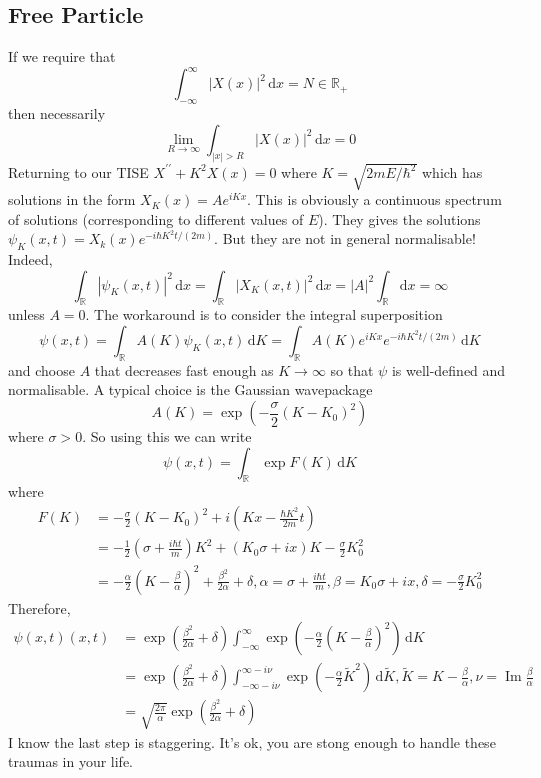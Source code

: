 \subsection{Free Particle}
If we require that
$$\int_{-\infty}^\infty |X(x)|^2\,\mathrm dx=N\in\mathbb R_+$$
then necessarily
$$\lim_{R\to\infty}\int_{|x|>R}|X(x)|^2\,\mathrm dx=0$$
Returning to our TISE $X^{\prime\prime}+K^2X(x)=0$ where $K=\sqrt{2mE/\hbar^2}$ which has solutions in the form $X_K(x)=Ae^{iKx}$.
This is obviously a continuous spectrum of solutions (corresponding to different values of $E$).
They gives the solutions $\psi_K(x,t)=X_k(x)e^{-i\hbar K^2t/(2m)}$.
But they are not in general normalisable!
Indeed,
$$\int_{\mathbb R}|\psi_K(x,t)|^2\,\mathrm dx=\int_{\mathbb R}|X_K(x,t)|^2\,\mathrm dx=|A|^2\int_{\mathbb R}\mathrm dx=\infty$$
unless $A=0$.
The workaround is to consider the integral superposition
$$\psi(x,t)=\int_{\mathbb R}A(K)\psi_K(x,t)\,\mathrm dK=\int_{\mathbb R}A(K)e^{iKx}e^{-i\hbar K^2t/(2m)}\,\mathrm dK$$
and choose $A$ that decreases fast enough as $K\to\infty$ so that $\psi$ is well-defined and normalisable.
A typical choice is the Gaussian wavepackage
$$A(K)=\exp\left( -\frac{\sigma}{2}(K-K_0)^2 \right)$$
where $\sigma>0$.
So using this we can write
$$\psi(x,t)=\int_{\mathbb R}\exp F(K)\,\mathrm dK$$
where
\begin{align*}
    F(K)&=-\frac{\sigma}{2}(K-K_0)^2+i\left(Kx-\frac{\hbar K^2}{2m}t\right)\\
    &=-\frac{1}{2}\left( \sigma+\frac{i\hbar t}{m} \right)K^2+(K_0\sigma+ix)K-\frac{\sigma}{2}K_0^2\\
    &=-\frac{\alpha}{2}\left( K-\frac{\beta}{\alpha} \right)^2+\frac{\beta^2}{2\alpha}+\delta,\alpha=\sigma+\frac{i\hbar t}{m},\beta=K_0\sigma+ix,\delta=-\frac{\sigma}{2}K_0^2
\end{align*}
Therefore,
\begin{align*}
    \psi(x,t)(x,t)&=\exp\left( \frac{\beta^2}{2\alpha}+\delta \right)\int_{-\infty}^\infty\exp\left( -\frac{\alpha}{2}\left( K-\frac{\beta}{\alpha} \right)^2 \right)\,\mathrm dK\\
    &=\exp\left( \frac{\beta^2}{2\alpha}+\delta \right)\int_{-\infty-i\nu}^{\infty-i\nu}\exp\left( -\frac{\alpha}{2}\tilde{K}^2 \right)\,\mathrm d\tilde{K},\tilde{K}=K-\frac{\beta}{\alpha},\nu=\operatorname{Im}\frac{\beta}{\alpha}\\
    &=\sqrt{\frac{2\pi}{\alpha}}\exp\left( \frac{\beta^2}{2\alpha}+\delta \right)
\end{align*}
I know the last step is staggering.
It's ok, you are stong enough to handle these traumas in your life.
